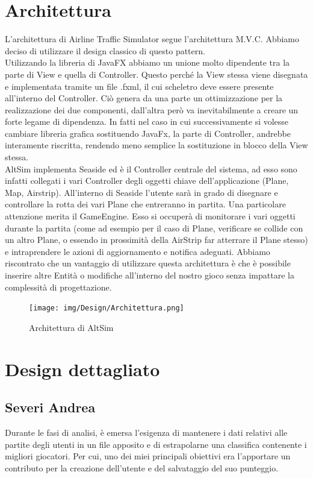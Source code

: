 \documentclass[a4paper,12pt]{report}
\begin{document}
\section{Architettura}
L’architettura di Airline Traffic Simulator segue l’architettura M.V.C. \newline
Abbiamo deciso di utilizzare il design classico di questo pattern.
\\
Utilizzando la libreria di JavaFX abbiamo un unione molto dipendente tra la parte di View e quella di Controller.
Questo perché la View stessa viene disegnata e implementata tramite un file .fxml, il cui scheletro deve essere presente all’interno del Controller.
Ciò genera da una parte un ottimizzazione per la realizzazione dei due componenti, dall’altra però va inevitabilmente a creare un forte legame di dipendenza.
In fatti nel caso in cui successivamente si volesse cambiare libreria grafica sostituendo JavaFx, la parte di Controller, andrebbe interamente riscritta, rendendo meno semplice la sostituzione in blocco della View stessa.
\\
AltSim implementa Seaside ed è il Controller centrale del sistema, ad esso sono infatti collegati i vari Controller degli oggetti chiave dell’applicazione (Plane, Map, Airstrip).
All’interno di Seaside l’utente sarà in grado di disegnare e controllare la rotta dei vari Plane che entreranno in partita.
Una particolare attenzione merita il GameEngine.
Esso si occuperà di monitorare i vari oggetti durante la partita (come ad esempio per il caso di Plane, verificare se collide con un altro Plane, o essendo in prossimità della AirStrip far atterrare il Plane stesso) e intraprendere le azioni di aggiornamento e notifica adeguati. Abbiamo riscontrato che un vantaggio di utilizzare questa architettura è che è possibile inserire altre Entità o modifiche all’interno del nostro gioco senza impattare la complessità di progettazione.
\begin{figure}[H]
    \begin{center}
        \centering
        \texttt{[image: img/Design/Architettura.png]}
    \end{center}
    \caption{Architettura di AltSim}
    \label{img:architettura}
\end{figure}

\clearpage

\section{Design dettagliato}
\subsection{Severi Andrea}
Durante le fasi di analisi, è emersa l'esigenza di mantenere i dati relativi alle partite degli utenti in un file apposito e di estrapolarne una classifica contenente i migliori giocatori. Per cui, uno dei miei principali obiettivi era l'apportare un contributo per la creazione dell'utente e del salvataggio del suo punteggio.
\end{document}
